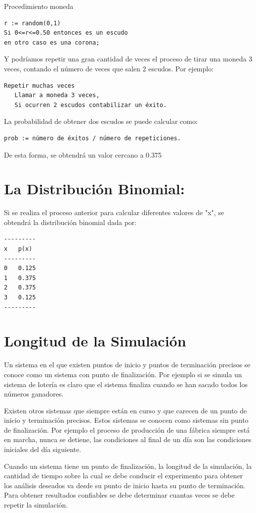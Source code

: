 Procedimiento moneda
\begin{verbatim}
r := random(0,1)
Si 0<=r<=0.50 entonces es un escudo
en otro caso es una corona;
\end{verbatim}

Y podríamos repetir una gran cantidad de veces el proceso de tirar una moneda 3 veces, contando el número de veces que salen 2 escudos. Por ejemplo:
\begin{verbatim}
Repetir muchas veces
   Llamar a moneda 3 veces,
   Si ocurren 2 escudos contabilizar un éxito.
\end{verbatim}

La probabilidad de obtener dos escudos se puede calcular como:
\begin{verbatim}prob := número de éxitos / número de repeticiones.
\end{verbatim}

De esta forma, se obtendrá un valor cercano a 0.375


\section{La Distribución Binomial:}

Si se realiza el proceso anterior para calcular diferentes valores de "x", se obtendrá la distribución binomial dada por:
\begin{verbatim}
---------
x   p(x)
---------
0   0.125
1   0.375
2   0.375
3   0.125
---------
\end{verbatim}



\section{Longitud de la Simulación}


Un sistema en el que existen puntos de inicio y puntos de terminación precisos se conoce como un sistema con punto de finalización. Por ejemplo si se simula un sistema de lotería es claro que el sistema finaliza cuando se han sacado todos los números ganadores.

Existen otros sistemas que siempre están en curso y que carecen de un punto de inicio y terminación precisos. Estos sistemas se conocen como sistemas sin punto de finalización. Por ejemplo el proceso de producción de una fábrica siempre está en marcha, nunca se detiene, las condiciones al final de un día son las condiciones iniciales del día siguiente.

Cuando un sistema tiene un punto de finalización, la longitud de la simulación, la cantidad de tiempo sobre la cual se debe conducir el experimento para obtener los análisis deseados va desde su punto de inicio hasta su punto de terminación. Para obtener resultados confiables se debe determinar cuantas veces se debe repetir la simulación.

